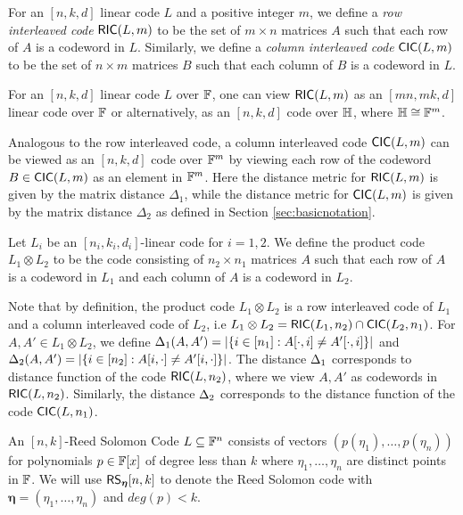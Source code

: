 \begin{definition}\label{defn:interleavedcode}
For an $[n,k,d]$ linear code $L$ and a positive integer $m$, we define a {\em row interleaved code} $\mathsf{RIC}(L,m)$ to be the set of $m\times n$ matrices $A$ such that each row of $A$ is a codeword in $L$. Similarly, we define a {\em column interleaved code} $\mathsf{CIC}(L,m)$ to be the set of $n\times m$ matrices $B$ such that each column of $B$ is a codeword in $L$.
\end{definition}

For  an  $[n,k,d]$ linear code $L$ over $\mathbb{F}$, one can view $\mathsf{RIC}(L,m)$ as
an $[mn,mk,d]$ linear code over  $\mathbb{F}$ or alternatively,  as an $[n,k,d]$ code over $\mathbb{H}$, where $\mathbb{H}\cong \mathbb{F}^m$. %

Analogous to the row interleaved code, a column interleaved code $\mathsf{CIC}(L,m)$ 
can be viewed as an $[n,k,d]$ code over $\mathbb{F}^m$ by viewing each row of the
codeword $B\in \mathsf{CIC}(L,m)$ as an element in $\mathbb{F}^m$. Here the distance metric
for $\mathsf{RIC}(L,m)$ is given by the matrix distance $\Delta_1$, while the distance
metric for $\mathsf{CIC}(L,m)$ is given by the matrix distance $\Delta_2$ as defined in
Section \ref{sec:basicnotation}.  
 
\begin{definition}\label{defn:productcode}
Let $L_i$ be an $[n_i,k_i,d_i]$-linear code for $i=1,2$. We define the product
code $L_1\otimes L_2$ to be the code consisting of $n_2\times n_1$ matrices $A$
such that each row of $A$ is a codeword in $L_1$ and each column of $A$ is a
codeword in $L_2$.
\end{definition}

Note that by definition, the product code $L_1\otimes L_2$ is a row interleaved
code of $L_1$ and a column interleaved code of $L_2$, i.e $L_1\otimes L_2 =
\mathsf{RIC}(L_1,n_2)\cap \mathsf{CIC}(L_2,n_1)$. For $A,A'\in L_1\otimes L_2$, we define
$\Delta_1(A,A')=|\{i\in [n_1]: A[\cdot,i]\neq A'[\cdot,i]\}|$ and
$\Delta_2(A,A')=|\{i\in [n_2]: A[i,\cdot]\neq A'[i,\cdot]\}|$. The distance
$\Delta_1$ corresponds to distance function of the code $\mathsf{RIC}(L,n_2)$, where we
view $A,A'$ as codewords in $\mathsf{RIC}(L,n_2)$. Similarly, the distance $\Delta_2$
corresponds to the distance function of the code $\mathsf{CIC}(L,n_1)$.

\begin{definition}\label{defn:rscode}
An $[n,k]$-Reed Solomon Code $L\subseteq \mathbb{F}^n$ consists of vectors
$(p(\eta_1),\ldots,p(\eta_n))$ for polynomials $p\in \mathbb{F}[x]$ of degree less
than $k$ where $\eta_1,\ldots,\eta_n$ are distinct points in $\mathbb{F}$. We will use
$\mathsf{RS}_{\bm{\eta}}[n,k]$ to denote the Reed Solomon code with
$\bm{\eta}=(\eta_1,\ldots,\eta_n)$ and $deg(p)<k$. 
\end{definition}

